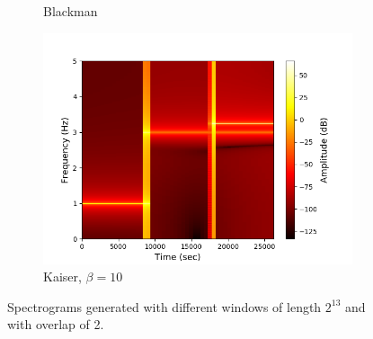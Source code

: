 \begin{figure}[H]
\begin{subfigure}{0.49\textwidth}
\caption{Blackman}
\label{fig:stft_blackman}
\includegraphics[width=\textwidth]{figures/stft_windows/kaiser/10000/10.png}
\caption{Kaiser, $\beta=10$}
\label{fig:stft_kaiser_10000_10}
\end{subfigure}
\caption{Spectrograms generated with different windows of length $2^{13}$ and with overlap of 2.}
\label{fig:stft_windows_10000}
\end{figure}
